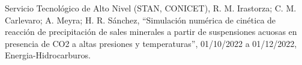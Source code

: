 \documentclass[margin,line]{res}
\begin{document}
\begin{resume}
Servicio Tecnológico de Alto Nivel (STAN, CONICET), R. M. Irastorza; C. M. Carlevaro; A. Meyra; H. R. Sánchez, ``Simulación numérica de cinética de reacción de precipitación de sales minerales a partir de suspensiones acuosas en presencia de CO2 a altas presiones y temperaturas'', 01/10/2022 a 01/12/2022, Energia-Hidrocarburos.


% 
% 
% 
% 
% 
% 
% 
% 

\end{resume}
\end{document}
